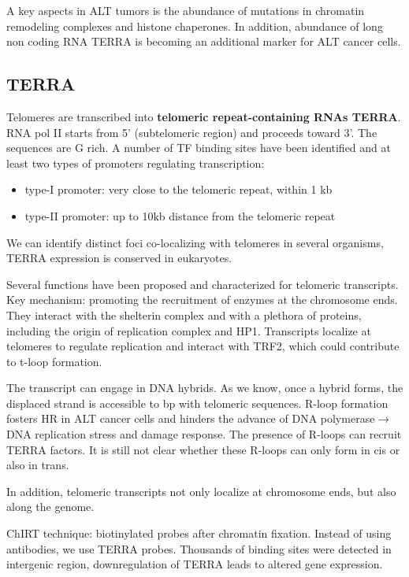 A key aspects in ALT tumors is the abundance of mutations in chromatin
remodeling complexes and histone chaperones. In addition, abundance of
long non coding RNA TERRA is becoming an additional marker for ALT
cancer cells.

\hypertarget{terra}{%
\subsection{TERRA}\label{terra}}

Telomeres are transcribed into \textbf{telomeric repeat-containing RNAs
TERRA}. RNA pol II starts from 5' (subtelomeric region) and
proceeds toward 3'. The sequences are G rich. A number of TF binding
sites have been identified and at least two types of promoters
regulating transcription:

\begin{itemize}
\tightlist
\item
  type-I promoter: very close to the telomeric repeat, within 1 kb
\item
  type-II promoter: up to 10kb distance from the telomeric repeat
\end{itemize}

We can identify distinct foci co-localizing with telomeres in several
organisms, TERRA expression is conserved in eukaryotes.

Several functions have been proposed and characterized for telomeric
transcripts. Key mechanism: promoting the recruitment of enzymes at the
chromosome ends. They interact with the shelterin complex and with a
plethora of proteins, including the origin of replication complex and
HP1. Transcripts localize at telomeres to regulate replication and
interact with TRF2, which could contribute to t-loop formation.

The transcript can engage in DNA hybrids. As we know, once a hybrid
forms, the displaced strand is accessible to bp with telomeric
sequences. R-loop formation fosters HR in ALT cancer cells and hinders
the advance of DNA polymerase → DNA replication stress and damage
response. The presence of R-loops can recruit TERRA factors. It is still
not clear whether these R-loops can only form in cis or also in trans.

In addition, telomeric transcripts not only localize at chromosome ends,
but also along the genome.

ChIRT technique: biotinylated probes after chromatin fixation. Instead
of using antibodies, we use TERRA probes. Thousands of binding sites
were detected in intergenic region, downregulation of TERRA leads to
altered gene expression.

